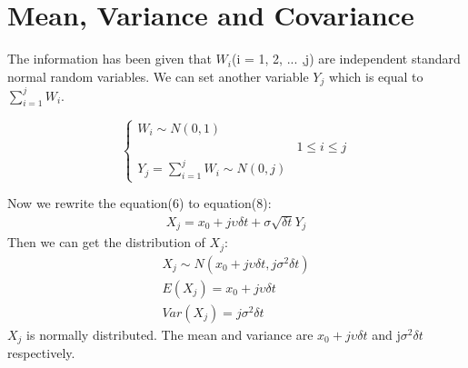 \documentclass[twoside,11pt]{article}
\begin{document}
\section{Mean, Variance and Covariance}

The information has been given that $W_{i}$(i = 1, 2, ... ,j) are independent standard normal random variables. We can set another variable $Y_{j}$ which is equal to $\sum_{i=1}^{j}W_{i}$.

\begin{equation}
\left\{
             \begin{array}{lr}
             W_{i} \sim N(0,1) \\
              & 1\leq i\leq j\\
             Y_{j}=\sum_{i=1}^{j}W_{i} \sim N(0,j)
             \end{array}
\right.
\end{equation}

Now we rewrite the equation(6) to equation(8):
\begin{align}
    X_{j} =  x_{0} +j\upsilon\delta t+\sigma\sqrt{\delta t}Y_{j}
\end{align}
Then we can get the distribution of $X_{j}$: 
\begin{align}
    X_{j} \sim N(x_{0} +j\upsilon\delta t, j\sigma^{2}\delta t)\\
    E(X_{j}) = x_{0} +j\upsilon\delta t\\
    Var(X_{j}) = j\sigma^{2}\delta t
\end{align}
$X_{j}$ is normally distributed. The mean and variance are $x_{0} +j\upsilon\delta t$ and  j$\sigma^{2}\delta t$ respectively.
\end{document}
